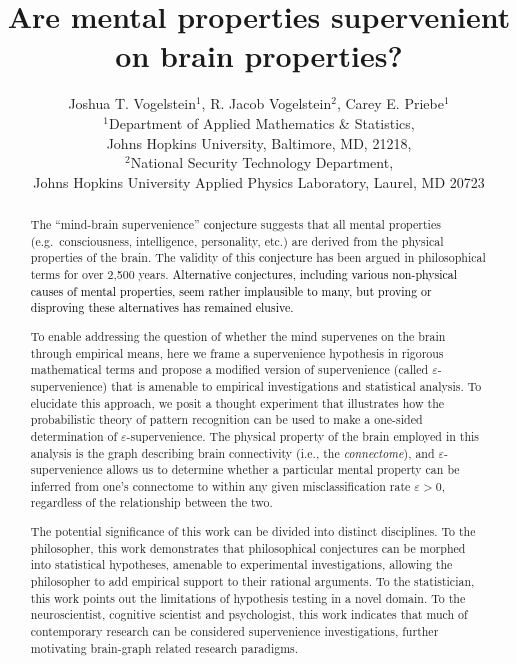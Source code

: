 \documentclass{article}
\title{Are mental properties supervenient on brain properties?}
\author{Joshua T. Vogelstein$^1$, R. Jacob Vogelstein$^2$, Carey E. Priebe$^1$\\
$^1$Department of Applied Mathematics \& Statistics, \\ Johns Hopkins University, Baltimore, MD, 21218,\\ $^2$National Security Technology Department, \\ Johns Hopkins University Applied Physics Laboratory, Laurel, MD 20723
}
\providecommand{\tr}[1]{\textcolor{black}{#1}}
\begin{document}
\maketitle
\begin{abstract}

The ``mind-brain supervenience'' \tr{conjecture} suggests that all mental properties (e.g.\ consciousness, intelligence, personality, etc.) are derived from the physical properties of the brain. The validity of this \tr{conjecture} has been argued in philosophical terms for over 2,500 years. \tr{Alternative conjectures, including various non-physical causes of mental properties, seem rather implausible to many, but proving or disproving these alternatives has remained elusive.}  


To enable addressing the question of whether the mind supervenes on the brain through empirical means, here we frame a supervenience hypothesis in rigorous mathematical terms and propose a modified version of supervenience (called $\varepsilon$-supervenience) that is amenable to empirical investigations and statistical analysis. To elucidate this approach, we posit a thought experiment that illustrates how the probabilistic theory of pattern recognition can be used to make a one-sided determination of $\varepsilon$-supervenience. The physical property of the brain employed in this analysis is the graph describing brain connectivity (i.e., the \emph{connectome}), and $\varepsilon$-supervenience allows us to determine whether a particular mental property can be inferred from one's connectome to within any given misclassification rate $\varepsilon > 0$, regardless of the relationship between the two. %

The potential significance of this work can be divided into distinct disciplines.  To the philosopher, this work demonstrates that philosophical conjectures can be morphed into statistical hypotheses, amenable to experimental investigations, allowing the philosopher to add empirical support to their rational arguments.  To the statistician, this work points out the limitations of hypothesis testing in a novel domain.   To the neuroscientist, cognitive scientist and psychologist, this work indicates that much of contemporary research can be considered supervenience investigations, further motivating brain-graph related research paradigms.



\end{abstract}
\end{document}
